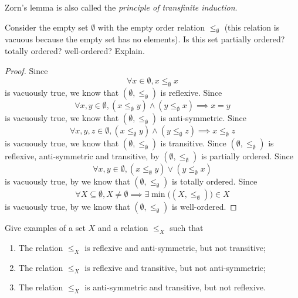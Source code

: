 \begin{note}
  Zorn's lemma is also called the \emph{principle of transfinite induction}.
\end{note}

\exercisesection

\begin{ex}\label{i:ex:8.5.1}
  Consider the empty set \(\emptyset\) with the empty order relation \(\leq_\emptyset\)
  (this relation is vacuous because the empty set has no elements).
  Is this set partially ordered? totally ordered? well-ordered? Explain.
\end{ex}

\begin{proof}
  Since
  \[
    \forall x \in \emptyset, x \leq_{\emptyset} x
  \]
  is vacuously true, we know that \((\emptyset, \leq_{\emptyset})\) is reflexive.
  Since
  \[
    \forall x, y \in \emptyset, (x \leq_{\emptyset} y) \land (y \leq_{\emptyset} x) \implies x = y
  \]
  is vacuously true, we know that \((\emptyset, \leq_{\emptyset})\) is anti-symmetric.
  Since
  \[
    \forall x, y, z \in \emptyset, (x \leq_{\emptyset} y) \land (y \leq_{\emptyset} z) \implies x \leq_{\emptyset} z
  \]
  is vacuously true, we know that \((\emptyset, \leq_{\emptyset})\) is transitive.
  Since \((\emptyset, \leq_{\emptyset})\) is reflexive, anti-symmetric and transitive, by  \((\emptyset, \leq_{\emptyset})\) is partially ordered.
  Since
  \[
    \forall x, y \in \emptyset, (x \leq_{\emptyset} y) \lor (y \leq_{\emptyset} x)
  \]
  is vacuously true, by  we know that \((\emptyset, \leq_{\emptyset})\) is totally ordered.
  Since
  \[
    \forall X \subseteq \emptyset, X \neq \emptyset \implies \exists \min\big((X, \leq_{\emptyset})\big) \in X
  \]
  is vacuously true, by  we know that \((\emptyset, \leq_{\emptyset})\) is well-ordered.
\end{proof}

\begin{ex}\label{i:ex:8.5.2}
  Give examples of a set \(X\) and a relation \(\leq_X\) such that
  \begin{enumerate}
    \item The relation \(\leq_X\) is reflexive and anti-symmetric, but not transitive;
    \item The relation \(\leq_X\) is reflexive and transitive, but not anti-symmetric;
    \item The relation \(\leq_X\) is anti-symmetric and transitive, but not reflexive.
  \end{enumerate}
\end{ex}

